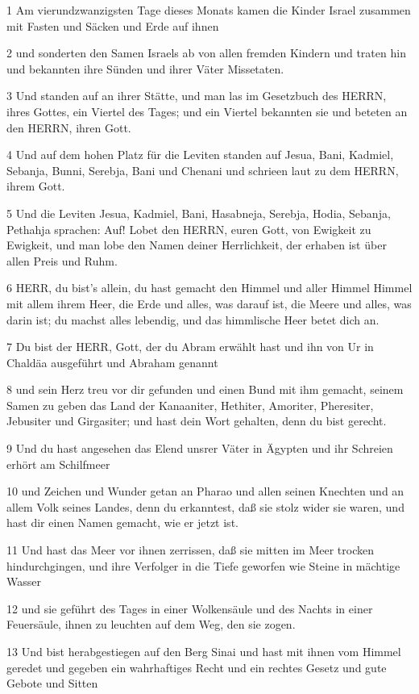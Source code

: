 \par 1 Am vierundzwanzigsten Tage dieses Monats kamen die Kinder Israel zusammen mit Fasten und Säcken und Erde auf ihnen
\par 2 und sonderten den Samen Israels ab von allen fremden Kindern und traten hin und bekannten ihre Sünden und ihrer Väter Missetaten.
\par 3 Und standen auf an ihrer Stätte, und man las im Gesetzbuch des HERRN, ihres Gottes, ein Viertel des Tages; und ein Viertel bekannten sie und beteten an den HERRN, ihren Gott.
\par 4 Und auf dem hohen Platz für die Leviten standen auf Jesua, Bani, Kadmiel, Sebanja, Bunni, Serebja, Bani und Chenani und schrieen laut zu dem HERRN, ihrem Gott.
\par 5 Und die Leviten Jesua, Kadmiel, Bani, Hasabneja, Serebja, Hodia, Sebanja, Pethahja sprachen: Auf! Lobet den HERRN, euren Gott, von Ewigkeit zu Ewigkeit, und man lobe den Namen deiner Herrlichkeit, der erhaben ist über allen Preis und Ruhm.
\par 6 HERR, du bist's allein, du hast gemacht den Himmel und aller Himmel Himmel mit allem ihrem Heer, die Erde und alles, was darauf ist, die Meere und alles, was darin ist; du machst alles lebendig, und das himmlische Heer betet dich an.
\par 7 Du bist der HERR, Gott, der du Abram erwählt hast und ihn von Ur in Chaldäa ausgeführt und Abraham genannt
\par 8 und sein Herz treu vor dir gefunden und einen Bund mit ihm gemacht, seinem Samen zu geben das Land der Kanaaniter, Hethiter, Amoriter, Pheresiter, Jebusiter und Girgasiter; und hast dein Wort gehalten, denn du bist gerecht.
\par 9 Und du hast angesehen das Elend unsrer Väter in Ägypten und ihr Schreien erhört am Schilfmeer
\par 10 und Zeichen und Wunder getan an Pharao und allen seinen Knechten und an allem Volk seines Landes, denn du erkanntest, daß sie stolz wider sie waren, und hast dir einen Namen gemacht, wie er jetzt ist.
\par 11 Und hast das Meer vor ihnen zerrissen, daß sie mitten im Meer trocken hindurchgingen, und ihre Verfolger in die Tiefe geworfen wie Steine in mächtige Wasser
\par 12 und sie geführt des Tages in einer Wolkensäule und des Nachts in einer Feuersäule, ihnen zu leuchten auf dem Weg, den sie zogen.
\par 13 Und bist herabgestiegen auf den Berg Sinai und hast mit ihnen vom Himmel geredet und gegeben ein wahrhaftiges Recht und ein rechtes Gesetz und gute Gebote und Sitten
